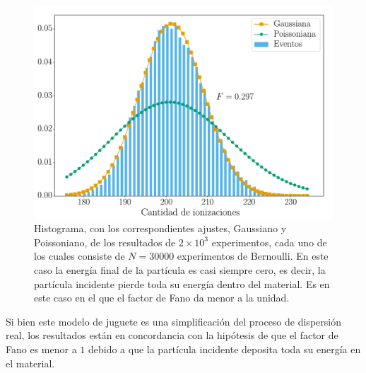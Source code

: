 \begin{figure}%
    \centering
    \includegraphics[scale=0.35]{Figs/Orden0_fano0.pdf}
    \caption{\footnotesize{Histograma, con los correspondientes ajustes, Gaussiano y Poissoniano, de los resultados de $2\times 10^3$ experimentos, cada uno de los cuales consiste de $N = 30000$ experimentos de Bernoulli. En este caso la energía final de la partícula es casi siempre cero, es decir, la partícula incidente pierde toda su energía dentro del material. Es en este caso en el que el factor de Fano da menor a la unidad.}}
    \label{fig:SimulacionOrden0Fano0}
\end{figure}
\indent Si bien este modelo de juguete es una simplificación del proceso de dispersión real, los resultados están en concordancia con la hipótesis de que el factor de Fano es menor a $1$ debido a que la partícula incidente deposita toda su energía en el material.\\
